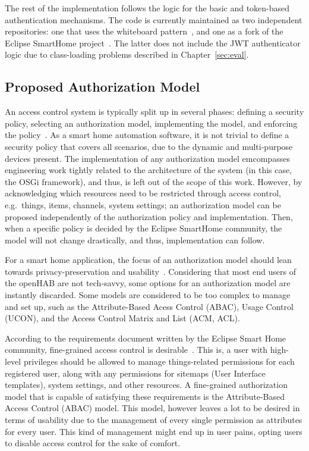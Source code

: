 \documentclass[12pt]{article}
\begin{document}
The rest of the implementation follows the logic for the basic and token-based authentication mechanisms. The code is currently maintained as two independent repositories: one that uses the whiteboard pattern~\cite{repo_02}, and one as a fork of the Eclipse SmartHome project~\cite{repo_01}. The latter does not include the JWT authenticator logic due to class-loading problems described in Chapter~\ref{sec:eval}.
  
\subsection{Proposed Authorization Model}
\label{ssec:autho}

An access control system is typically split up in several phases: defining a security policy, selecting an authorization model, implementing the model, and enforcing the policy~\cite{access_01}. As a smart home automation software, it is not trivial to define a security policy that covers all scenarios, due to the dynamic and multi-purpose devices present. The implementation of any authorization model emcompasses engineering work tightly related to the architecture of the system (in this case, the OSGi framework), and thus, is left out of the scope of this work. However, by acknowledging which resources need to be restricted through access control, e.g.\ things, items, channels, system settings; an authorization model can be proposed independently of the authorization policy and implementation. Then, when a specific policy is decided by the Eclipse SmartHome community, the model will not change drastically, and thus, implementation can follow. 

For a smart home application, the focus of an authorization model should lean towards privacy-preservation and usability~\cite{access_01}. Considering that most end users of the openHAB are not tech-savvy, some options for an authorization model are instantly discarded. Some models are considered to be too complex to manage and set up, such as the Attribute-Based Acess Control (ABAC), Usage Control (UCON), and the Access Control Matrix and List (ACM, ACL).

According to the requirements document written by the Eclipse Smart Home community, fine-grained access control is desirable~\cite{esh_06}. This is, a user with high-level privileges should be allowed to manage things-related permissions for each registered user, along with any permissions for sitemaps (User Interface templates), system settings, and other resources. A fine-grained authorization model that is capable of satisfying these requirements is the Attribute-Based Access Control (ABAC) model. This model, however leaves a lot to be desired in terms of usability due to the management of every single permission as attributes for every user. This kind of management might end up in user pains, opting users to disable access control for the sake of comfort. 
\end{document}
